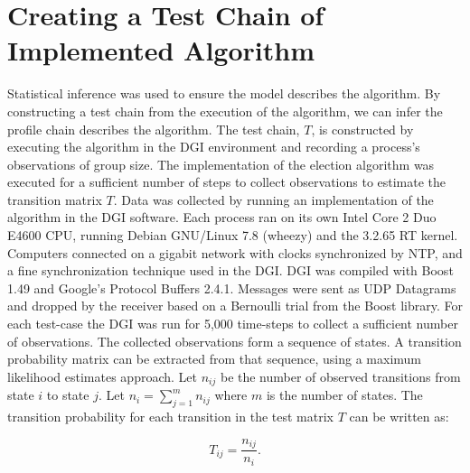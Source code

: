 
\section{Creating a Test Chain of Implemented Algorithm}

Statistical inference was used to ensure the model describes the algorithm.
By constructing a test chain from the execution of the algorithm, we can infer the profile chain describes the algorithm.
The test chain, $T$, is constructed by executing the algorithm in the DGI environment and recording a process's observations of group size.
The implementation of the election algorithm was executed for a sufficient number of steps to collect observations to estimate the transition matrix $T$.
Data was collected by running an implementation of the algorithm in the DGI software\cite{FREEDMGITHUB}.
Each process ran on its own Intel Core 2 Duo E4600 CPU, running Debian GNU/Linux 7.8 (wheezy) and the 3.2.65 RT kernel.
Computers connected on a gigabit network with clocks synchronized by NTP, and a fine synchronization technique used in the DGI.
DGI was compiled with Boost\cite{BOOST} 1.49 and Google's Protocol Buffers\cite{PROTOBUF} 2.4.1.
Messages were sent as UDP Datagrams and dropped by the receiver based on a Bernoulli trial from the Boost library.
For each test-case the DGI was run for 5,000 time-steps to collect a sufficient number of observations.
The collected observations form a sequence of states.
A transition probability matrix can be extracted from that sequence, using a maximum likelihood estimates approach.
Let $n_{ij}$ be the number of observed transitions from state $i$ to state $j$. Let $n_{i}=\sum_{j=1}^{m} n_{ij}$ where $m$ is the number of states.
The transition probability for each transition in the test matrix $T$ can be written as:

\begin{equation} T_{ij} = \frac{n_{ij}}{n_{i}}. \end{equation}
